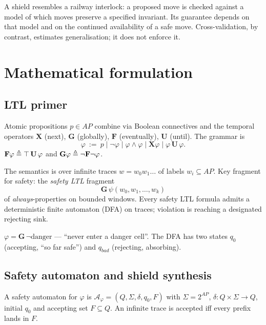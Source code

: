 \documentclass[11pt,oneside]{scrbook}
\begin{document}
\begin{intuition}
A shield resembles a railway interlock: a proposed move is checked against
a model of which moves preserve a specified invariant. Its guarantee depends
on that model and on the continued availability of a safe move.
Cross-validation, by contrast, estimates generalisation; it does not enforce it.
\end{intuition}

\chapter{Mathematical formulation}

\section{LTL primer}

\begin{definition}
Atomic propositions $p \in AP$ combine via Boolean connectives and the
temporal operators $\mathbf{X}$ (next), $\mathbf{G}$ (globally), $\mathbf{F}$
(eventually), $\mathbf{U}$ (until). The grammar is
\[
   \varphi \::=\: p \mid \neg \varphi \mid \varphi \wedge \varphi
              \mid \mathbf{X}\varphi \mid \varphi\, \mathbf{U}\, \varphi.
\]
$\mathbf{F}\varphi \triangleq \top\, \mathbf{U}\, \varphi$ and
$\mathbf{G}\varphi \triangleq \neg \mathbf{F}\neg\varphi$.
\end{definition}

The semantics is over infinite traces $w = w_0 w_1 \ldots$ of labels
$w_i \subseteq AP$. Key fragment for safety: the \emph{safety LTL} fragment
\[
   \mathbf{G}\, \psi(w_0, w_1, \ldots, w_k)
\]
of \emph{always}-properties on bounded windows. Every safety LTL formula
admits a deterministic finite automaton (DFA) on traces; violation is reaching
a designated rejecting sink.

\begin{example}
$\varphi = \mathbf{G}\, \neg \text{danger}$ --- ``never enter a danger cell''.
The DFA has two states $q_0$ (accepting, ``so far safe'') and $q_{bad}$
(rejecting, absorbing).
\end{example}

\section{Safety automaton and shield synthesis}

\begin{definition}
A safety automaton for $\varphi$ is $\mathcal{A}_\varphi = (Q, \Sigma, \delta,
q_0, F)$ with $\Sigma = 2^{AP}$, $\delta: Q \times \Sigma \to Q$, initial $q_0$
and accepting set $F \subseteq Q$. An infinite trace is accepted iff every
prefix lands in $F$.
\end{definition}
\end{document}
